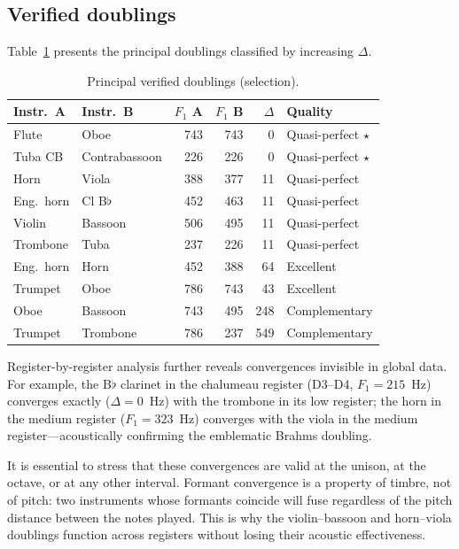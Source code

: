 \documentclass[12pt,a4paper]{article}
\begin{document}
\subsection{Verified doublings}

Table~\ref{tab:doublings} presents the principal doublings classified by
increasing $\Delta$.

\begin{table}[htbp]
\centering
\caption{Principal verified doublings (selection).}
\label{tab:doublings}
\begin{tabular}{llrrrl}
\toprule
Instr.~A & Instr.~B & $F_1$ A & $F_1$ B & $\Delta$ & Quality \\
\midrule
Flute & Oboe & 743 & 743 & 0 & Quasi-perfect $\star$ \\
Tuba CB & Contrabassoon & 226 & 226 & 0 & Quasi-perfect $\star$ \\
Horn & Viola & 388 & 377 & 11 & Quasi-perfect \\
Eng.\ horn & Cl B$\flat$ & 452 & 463 & 11 & Quasi-perfect \\
Violin & Bassoon & 506 & 495 & 11 & Quasi-perfect \\
Trombone & Tuba & 237 & 226 & 11 & Quasi-perfect \\
Eng.\ horn & Horn & 452 & 388 & 64 & Excellent \\
Trumpet & Oboe & 786 & 743 & 43 & Excellent \\
Oboe & Bassoon & 743 & 495 & 248 & Complementary \\
Trumpet & Trombone & 786 & 237 & 549 & Complementary \\
\bottomrule
\end{tabular}
\end{table}

Register-by-register analysis further reveals convergences invisible in global
data. For example, the B$\flat$ clarinet in the chalumeau register (D3--D4,
$F_1 = 215$~Hz) converges exactly ($\Delta = 0$~Hz) with the trombone in
its low register; the horn in the medium register ($F_1 = 323$~Hz) converges
with the viola in the medium register---acoustically confirming the emblematic
Brahms doubling.

It is essential to stress that these convergences are valid at the unison, at
the octave, or at any other interval. Formant convergence is a property of
timbre, not of pitch: two instruments whose formants coincide will fuse
regardless of the pitch distance between the notes played. This is why the
violin--bassoon and horn--viola doublings function across registers without
losing their acoustic effectiveness.
\end{document}
